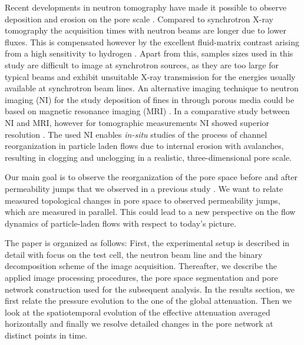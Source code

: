 \documentclass[smallextended]{svjour3}       %
\begin{document}
Recent developments in neutron tomography have made it possible to observe deposition and erosion on the pore scale \cite{Gruenzweig-etal-2013,Kaestner-etal_2016}. Compared to synchrotron X-ray tomography the acquisition times with neutron beams are longer due to lower fluxes. This is compensated however by the excellent fluid-matrix contrast arising from a high sensitivity to hydrogen \cite{Kaestner-etal_2016}. Apart from this, samples sizes used in this study are difficult to image at synchrotron sources, as they are too large for typical beams and exhibit unsuitable X-ray transmission for the energies usually available at synchrotron beam lines. An alternative imaging technique to neutron imaging (NI) for the study deposition of fines in through porous media could be based on magnetic resonance imaging (MRI) \cite{Sederman-gladden-2001,Britton-2007}. In a comparative study between NI and MRI, however for tomographic measurements NI showed superior resolution \cite{Oswald-etal-2015}. The used NI enables \textit{in-situ} studies of the process of channel reorganization in particle laden flows due to internal erosion with avalanches, resulting in clogging and unclogging in a realistic, three-dimensional pore scale.

Our main goal is to observe the reorganization of the pore space before and after permeability jumps that we observed in a previous study \cite{Bianchi-etal_2017}. We want to relate measured topological changes in pore space to observed permeability jumps, which are measured in parallel. This could lead to a new perspective on the flow dynamics of particle-laden flows with respect to today's picture.

The paper is organized as follows: First, the experimental setup is described in detail with focus on the test cell, the neutron beam line and the binary decomposition scheme of the image acquisition. Thereafter, we describe the applied image processing procedures, the pore space segmentation and pore network construction used for the subsequent analysis. In the results section, we first relate the pressure evolution to the one of the global attenuation. Then we look at the spatiotemporal evolution of the effective attenuation averaged horizontally and finally we resolve detailed changes in the pore network at distinct points in time.
\end{document}
